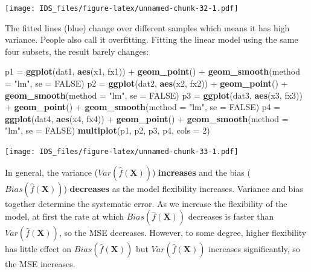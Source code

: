 \documentclass[12pt,]{krantz}
\newenvironment{Shaded}{\begin{snugshade}}{\end{snugshade}}
\newcommand{\KeywordTok}[1]{\textcolor[rgb]{0.13,0.29,0.53}{\textbf{{#1}}}}
\newcommand{\DataTypeTok}[1]{\textcolor[rgb]{0.13,0.29,0.53}{{#1}}}
\newcommand{\DecValTok}[1]{\textcolor[rgb]{0.00,0.00,0.81}{{#1}}}
\newcommand{\StringTok}[1]{\textcolor[rgb]{0.31,0.60,0.02}{{#1}}}
\newcommand{\OtherTok}[1]{\textcolor[rgb]{0.56,0.35,0.01}{{#1}}}
\newcommand{\NormalTok}[1]{{#1}}
\theoremstyle{definition}
\theoremstyle{definition}
\theoremstyle{remark}
\begin{document}
\texttt{[image: IDS\_files/figure-latex/unnamed-chunk-32-1.pdf]}

The fitted lines (blue) change over different samples which means it has
high variance. People also call it overfitting. Fitting the linear model
using the same four subsets, the result barely changes:

\begin{Shaded}
\begin{Highlighting}[]
\NormalTok{p1 =}\StringTok{ }\KeywordTok{ggplot}\NormalTok{(dat1, }\KeywordTok{aes}\NormalTok{(x1, fx1)) +}\StringTok{ }\KeywordTok{geom_point}\NormalTok{() +}\StringTok{ }\KeywordTok{geom_smooth}\NormalTok{(}\DataTypeTok{method =} \StringTok{"lm"}\NormalTok{, }
    \DataTypeTok{se =} \OtherTok{FALSE}\NormalTok{)}
\NormalTok{p2 =}\StringTok{ }\KeywordTok{ggplot}\NormalTok{(dat2, }\KeywordTok{aes}\NormalTok{(x2, fx2)) +}\StringTok{ }\KeywordTok{geom_point}\NormalTok{() +}\StringTok{ }\KeywordTok{geom_smooth}\NormalTok{(}\DataTypeTok{method =} \StringTok{"lm"}\NormalTok{, }
    \DataTypeTok{se =} \OtherTok{FALSE}\NormalTok{)}
\NormalTok{p3 =}\StringTok{ }\KeywordTok{ggplot}\NormalTok{(dat3, }\KeywordTok{aes}\NormalTok{(x3, fx3)) +}\StringTok{ }\KeywordTok{geom_point}\NormalTok{() +}\StringTok{ }\KeywordTok{geom_smooth}\NormalTok{(}\DataTypeTok{method =} \StringTok{"lm"}\NormalTok{, }
    \DataTypeTok{se =} \OtherTok{FALSE}\NormalTok{)}
\NormalTok{p4 =}\StringTok{ }\KeywordTok{ggplot}\NormalTok{(dat4, }\KeywordTok{aes}\NormalTok{(x4, fx4)) +}\StringTok{ }\KeywordTok{geom_point}\NormalTok{() +}\StringTok{ }\KeywordTok{geom_smooth}\NormalTok{(}\DataTypeTok{method =} \StringTok{"lm"}\NormalTok{, }
    \DataTypeTok{se =} \OtherTok{FALSE}\NormalTok{)}
\KeywordTok{multiplot}\NormalTok{(p1, p2, p3, p4, }\DataTypeTok{cols =} \DecValTok{2}\NormalTok{)}
\end{Highlighting}
\end{Shaded}

\texttt{[image: IDS\_files/figure-latex/unnamed-chunk-33-1.pdf]}

In general, the variance (\(Var(\hat{f}(\mathbf{X}))\))
\textbf{increases} and the bias (\(Bias(\hat{f}(\mathbf{X}))\))
\textbf{decreases} as the model flexibility increases. Variance and bias
together determine the systematic error. As we increase the flexibility
of the model, at first the rate at which \(Bias(\hat{f}(\mathbf{X}))\)
decreases is faster than \(Var (\hat{f} (\mathbf{X}))\), so the MSE
decreases. However, to some degree, higher flexibility has little effect
on \(Bias(\hat{f}(\mathbf{X}))\) but \(Var(\hat{f} (\mathbf{X}))\)
increases significantly, so the MSE increases.
\end{document}
